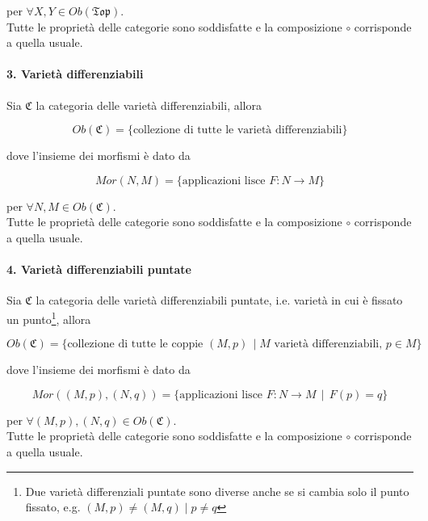 per $ \forall X,Y \in Ob(\mathfrak{Top}) $.\\
Tutte le proprietà delle categorie sono soddisfatte e la composizione $ \circ $ corrisponde a quella usuale.

\paragraph{3. Varietà differenziabili}

Sia $ \mathfrak{C} $ la categoria delle varietà differenziabili, allora

\begin{equation}
	Ob(\mathfrak{C}) = \{ \text{collezione di tutte le varietà differenziabili} \}
\end{equation}

dove l'insieme dei morfismi è dato da

\begin{equation}
	Mor(N,M) = \{ \text{applicazioni lisce } F : N \to M \}
\end{equation}

per $ \forall N,M \in Ob(\mathfrak{C}) $.\\
Tutte le proprietà delle categorie sono soddisfatte e la composizione $ \circ $ corrisponde a quella usuale.

\paragraph{4. Varietà differenziabili puntate}

Sia $ \mathfrak{C} $ la categoria delle varietà differenziabili puntate, i.e. varietà in cui è fissato un punto\footnote{%
	Due varietà differenziali puntate sono diverse anche se si cambia solo il punto fissato, e.g. $ (M,p) \neq (M,q) \mid p \neq q $}, allora

\begin{equation}
	Ob(\mathfrak{C}) = \{ \text{collezione di tutte le coppie } (M,p) \, \mid M \text{ varietà differenziabili}, \, p \in M \}
\end{equation}

dove l'insieme dei morfismi è dato da

\begin{equation}
	Mor((M,p),(N,q)) = \{ \text{applicazioni lisce } F : N \to M \, \mid \, F(p)=q \}
\end{equation}

per $ \forall (M,p),(N,q) \in Ob(\mathfrak{C}) $.\\
Tutte le proprietà delle categorie sono soddisfatte e la composizione $ \circ $ corrisponde a quella usuale.

